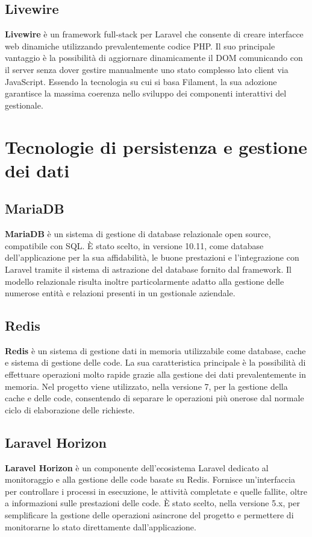 \subsection{Livewire}
\textbf{Livewire} è un framework full-stack per Laravel che consente di creare interfacce web dinamiche utilizzando prevalentemente codice PHP. Il suo principale 
vantaggio è la possibilità di aggiornare dinamicamente il DOM comunicando con il server senza dover gestire manualmente uno stato complesso lato client via JavaScript. 
Essendo la tecnologia su cui si basa Filament, la sua adozione garantisce la massima coerenza nello sviluppo dei componenti interattivi del gestionale.

\section{Tecnologie di persistenza e gestione dei dati}
\subsection{MariaDB}
\textbf{MariaDB} è un sistema di gestione di database relazionale open source, compatibile con SQL. È stato scelto, in versione 10.11, come database dell'applicazione per la sua affidabilità, 
le buone prestazioni e l'integrazione con Laravel tramite il sistema di astrazione del database fornito dal framework. Il modello relazionale risulta inoltre particolarmente 
adatto alla gestione delle numerose entità e relazioni presenti in un gestionale aziendale.

\subsection{Redis}
\textbf{Redis} è un sistema di gestione dati in memoria utilizzabile come database, cache e sistema di gestione delle code. La sua caratteristica principale è la possibilità di 
effettuare operazioni molto rapide grazie alla gestione dei dati prevalentemente in memoria. Nel progetto viene utilizzato, nella versione 7, per la gestione della cache e delle code, consentendo 
di separare le operazioni più onerose dal normale ciclo di elaborazione delle richieste.

\subsection{Laravel Horizon}
\textbf{Laravel Horizon} è un componente dell'ecosistema Laravel dedicato al monitoraggio e alla gestione delle code basate su Redis. Fornisce un'interfaccia per controllare i 
processi in esecuzione, le attività completate e quelle fallite, oltre a informazioni sulle prestazioni delle code. È stato scelto, nella versione 5.x, per semplificare la gestione delle operazioni 
asincrone del progetto e permettere di monitorarne lo stato direttamente dall'applicazione.

